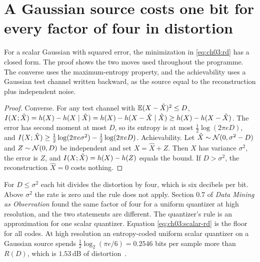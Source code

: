 
\section{A Gaussian source costs one bit for every factor of four in distortion}\label{sec:ch03:gauss-rd}

For a scalar Gaussian with squared error, the minimization in \eqref{eq:ch03:rd} has a closed form. The proof shows the two moves used throughout the programme. The converse uses the maximum-entropy property, and the achievability uses a Gaussian test channel written backward, as the source equal to the reconstruction plus independent noise.

\begin{proof}
Converse. For any test channel with $\mathbb{E}(X-\hat X)^2\le D$,
$I(X;\hat X)=h(X)-h(X\mid\hat X)=h(X)-h(X-\hat X\mid \hat X)\ge h(X)-h(X-\hat X)$.
The error has second moment at most $D$, so its entropy is at most $\frac12\log(2\pi eD)$, and $I(X;\hat X)\ge\frac12\log(2\pi e\sigma^2)-\frac12\log(2\pi e D)$.
Achievability. Let $\hat X\sim\mathcal{N}(0,\sigma^2-D)$ and $Z\sim\mathcal{N}(0,D)$ be independent and set $X=\hat X+Z$. Then $X$ has variance $\sigma^2$, the error is $Z$, and $I(X;\hat X)=h(X)-h(Z)$ equals the bound. If $D>\sigma^2$, the reconstruction $\hat X=0$ costs nothing.
\end{proof}

For $D\le\sigma^2$ each bit divides the distortion by four, which is six decibels per bit. Above $\sigma^2$ the rate is zero and the rule does not apply. Section 0.7 of \emph{Data Mining as Observation} found the same factor of four for a uniform quantizer at high resolution, and the two statements are different. The quantizer's rule is an approximation for one scalar quantizer. Equation \eqref{eq:ch03:scalar-rd} is the floor for all codes. At high resolution an entropy-coded uniform scalar quantizer on a Gaussian source spends $\frac12\log_2(\pi e/6)=0.2546$ bits per sample more than $R(D)$, which is $1.53$\,dB of distortion~\cite{grayneuhoff1998}.

